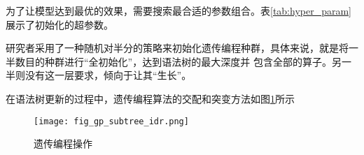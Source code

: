 为了让模型达到最优的效果，需要搜索最合适的参数组合。表\ref{tab:hyper_param}展示了初始化的超参数。



研究者采用了一种随机对半分的策略来初始化遗传编程种群，具体来说，就是将一半数目的种群进行“全初始化”，达到语法树的最大深度并
包含全部的算子。另一半则没有这一层要求，倾向于让其“生长”。

在语法树更新的过程中，遗传编程算法的交配和突变方法如图\ref{fig:gp_subtree_idr}所示

\begin{figure}[H]
    \texttt{[image: fig\_gp\_subtree\_idr.png]}
    \caption{遗传编程操作}
    \label{fig:gp_subtree_idr}
\end{figure}

